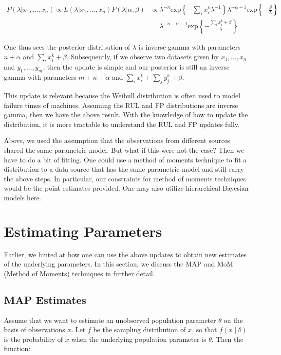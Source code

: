 \documentclass[english]{article}
\numberwithin{equation}{section}
\begin{document}
\begin{align*}
P(\lambda|x_1,\dots,x_n)\propto L(\lambda|x_1,\dots, x_n) P(\lambda|\alpha,\beta) &\propto \lambda^{-n}\text{exp}\left\{-\sum_i {x_i^k}\lambda^{-1}\right\}\lambda^{-\alpha-1}\text{exp}\left\{-\frac{\beta}{\lambda}\right\}\\
&=\lambda^{-n-\alpha-1}\text{exp}\left\{-\frac{\sum_i {x_i^k}+\beta}{\lambda}\right\}
\end{align*} 

One thus sees the posterior distribution of $\lambda$ is inverse gamma with parameters $n+\alpha$ and $\sum_i x_i^k + \beta$. Subsequently, if we observe two datasets given by $x_1,\ldots,x_n$ and $y_1,\ldots,y_m$, then the update is simple and our posterior is still an inverse gamma with parameters $m+n+\alpha$ and $\sum_i x_i^k + \sum_j y_j^k + \beta$.

This update is relevant because the Weibull distribution is often used to model failure times of machines. Assuming the RUL and FP distributions are inverse gamma, then we have the above result. With the knowledge of how to update the distribution, it is more tractable to understand the RUL and FP updates fully.

Above, we used the assumption that the observations from different sources shared the same parametric model. But what if this were not the case? Then we have to do a bit of fitting. One could use a method of moments technique to fit a distribution to a data source that has the same parametric model and still carry the above steps. In particular, our constraints for method of moments techniques would be the point estimates provided. One may also utilize hierarchical Bayesian models here.

\section*{Estimating Parameters}
Earlier, we hinted at how one can use the above updates to obtain new estimates of the underlying parameters. In this section, we discuss the MAP and MoM (Method of Moments) techniques in further detail.

\subsection*{MAP Estimates}
Assume that we want to estimate an unobserved population parameter $\theta$ on the basis of observations $x$. Let $f$ be the sampling distribution of $x$, so that $f(x\mid\theta)$ is the probability of $x$ when the underlying population parameter is $\theta$.  Then the function:
\end{document}
